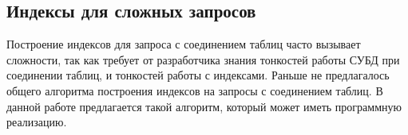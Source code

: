 \subsection{Индексы для сложных запросов}

Построение индексов для запроса с соединением таблиц часто вызывает сложности, так как требует от разработчика знания тонкостей работы СУБД при соединении таблиц, и тонкостей работы с индексами. Раньше не предлагалось общего алгоритма построения индексов на запросы с соединением таблиц. В данной работе предлагается такой алгоритм, который может иметь программную реализацию.